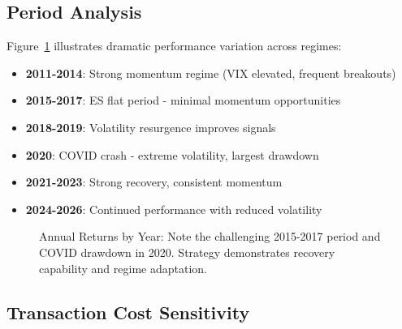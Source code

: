 \documentclass[twocolumn,ieee]{arithmaxresearch}
\begin{document}
\subsection{Period Analysis}

Figure~\ref{fig:yearly_performance} illustrates dramatic performance variation across regimes:

\begin{itemize}
    \item \textbf{2011-2014}: Strong momentum regime (VIX elevated, frequent breakouts)
    \item \textbf{2015-2017}: ES flat period - minimal momentum opportunities
    \item \textbf{2018-2019}: Volatility resurgence improves signals
    \item \textbf{2020}: COVID crash - extreme volatility, largest drawdown
    \item \textbf{2021-2023}: Strong recovery, consistent momentum
    \item \textbf{2024-2026}: Continued performance with reduced volatility
\end{itemize}

\begin{figure}[t]
\centering
{}
\caption{Annual Returns by Year: Note the challenging 2015-2017 period and COVID drawdown in 2020. Strategy demonstrates recovery capability and regime adaptation.}
\label{fig:yearly_performance}
\end{figure}

\subsection{Transaction Cost Sensitivity}
\end{document}
